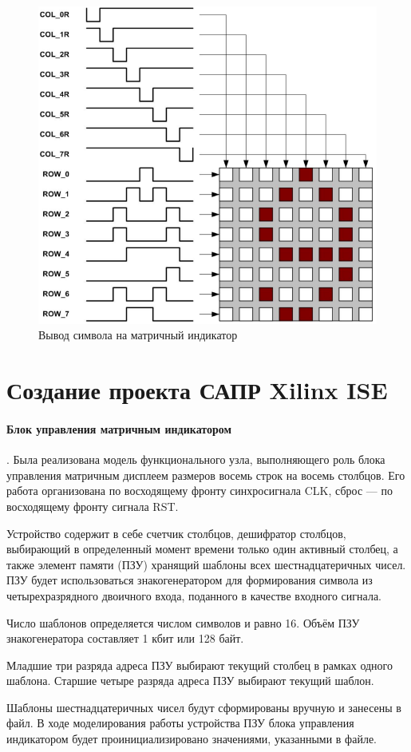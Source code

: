 \begin{figure}[h!]
	\centering
	\includegraphics[width=0.5\linewidth]{course-plis/images/lab4/display-principe}
	\caption{Вывод символа на матричный индикатор}
	\label{fig:display-principe}
\end{figure}


\section{Создание проекта САПР Xilinx ISE}

\paragraph{Блок управления матричным индикатором}.
Была реализована модель функционального узла, выполняющего роль блока управления матричным дисплеем размеров восемь строк на восемь столбцов. Его работа организована по восходящему фронту синхросигнала CLK, сброс --- по восходящему фронту сигнала RST. 

Устройство содержит в себе счетчик столбцов, дешифратор столбцов, выбирающий в определенный момент времени только один активный столбец, а также элемент памяти (ПЗУ) хранящий шаблоны всех шестнадцатеричных чисел. ПЗУ будет использоваться знакогенератором для формирования символа из четырехразрядного двоичного входа, поданного в качестве входного сигнала.

Число шаблонов определяется числом символов и равно 16.
Объём ПЗУ знакогенератора составляет 1 кбит или 128 байт.

Младшие три разряда адреса ПЗУ выбирают текущий столбец в рамках
одного шаблона.
Старшие четыре разряда адреса ПЗУ выбирают текущий шаблон.

Шаблоны шестнадцатеричных чисел будут сформированы вручную и занесены в файл. В ходе моделирования работы устройства ПЗУ блока управления индикатором будет проинициализировано значениями, указанными в файле.

